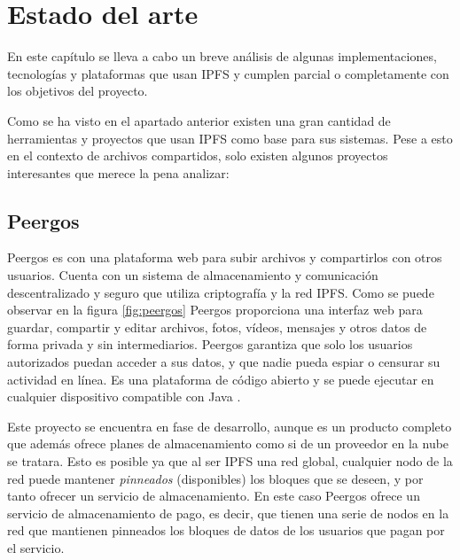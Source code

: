 \chapter{Estado del arte}\label{chap:3estadodelarte}

En este capítulo se lleva a cabo un breve análisis de algunas implementaciones, tecnologías y plataformas que usan IPFS 
y cumplen parcial o completamente con los objetivos del proyecto.

Como se ha visto en el apartado anterior existen una gran cantidad de herramientas y proyectos
que usan IPFS como base para sus sistemas. Pese a esto en el contexto de archivos compartidos, solo existen
algunos proyectos interesantes que merece la pena analizar:

\section{Peergos}

Peergos es con una plataforma web para subir archivos y compartirlos con otros usuarios. Cuenta con un sistema de
almacenamiento y comunicación descentralizado y seguro que utiliza criptografía y la red IPFS. Como se puede observar en la
figura \ref{fig:peergos} Peergos proporciona una interfaz web para guardar,
compartir y editar archivos, fotos, vídeos, mensajes y otros datos de forma privada y sin intermediarios. Peergos garantiza que
solo los usuarios autorizados puedan acceder a sus datos, y que nadie pueda espiar o censurar su actividad en línea. Es una
plataforma de código abierto y se puede ejecutar en cualquier dispositivo compatible con Java \cite{PeergosPeergosP2p}.

Este proyecto se encuentra en fase de desarrollo, aunque es un producto completo que además ofrece planes de almacenamiento
como si de un proveedor en la nube se tratara. Esto es posible ya que al ser IPFS una red global,
cualquier nodo de la red puede mantener \textit{pinneados} (disponibles) los bloques que se deseen, y por tanto
ofrecer un servicio de almacenamiento. En este caso Peergos ofrece un servicio de almacenamiento de pago, es decir,
que tienen una serie de nodos en la red que mantienen pinneados los bloques de datos de los usuarios que pagan por el servicio.

